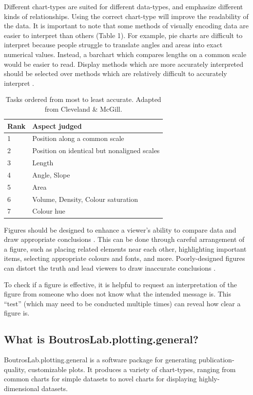 \documentclass[letterpaper]{report}\usepackage[]{graphicx}\usepackage[]{color}
\begin{document}
Different chart-types are suited for different data-types, and emphasize different kinds of relationships. Using the correct chart-type will improve the readability of the data. It is important to note that some methods of visually encoding data are easier to interpret than others (Table 1). For example, pie charts are difficult to interpret because people struggle to translate angles and areas into exact numerical values. Instead, a barchart which compares lengths on a common scale would be easier to read. Display methods which are more accurately interpreted should be selected over methods which are relatively difficult to accurately interpret \cite{wong1, cleveland}. 

\begin{table}
\begin{center}
\begin{tabular}{ l  l }
\hline
Rank & Aspect judged\\
\hline
1 & Position along a common scale\\
2 & Position on identical but nonaligned scales\\
3 & Length \\
4 & Angle, Slope\\
5 & Area\\
6 & Volume, Density, Colour saturation\\
7 & Colour hue\\
\end{tabular}
\end{center}
\caption{Tasks ordered from most to least accurate. Adapted from Cleveland \& McGill.}
\end{table}

Figures should be designed to enhance a viewer's ability to compare data and draw appropriate conclusions \cite{tufte}. This can be done through careful arrangement of a figure, such as placing related elements near each other, highlighting important items, selecting appropriate colours and fonts, and more. Poorly-designed figures can distort the truth and lead viewers to draw inaccurate conclusions \cite{tufte}. 

To check if a figure is effective, it is helpful to request an interpretation of the figure from someone who does not know what the intended message is. This ``test'' (which may need to be conducted multiple times) can reveal how clear a figure is.

\subsection{What is BoutrosLab.plotting.general?}
BoutrosLab.plotting.general is a software package for generating publication-quality, customizable plots. It produces a variety of chart-types, ranging from common charts for simple datasets to novel charts for displaying highly-dimensional datasets.
\end{document}
